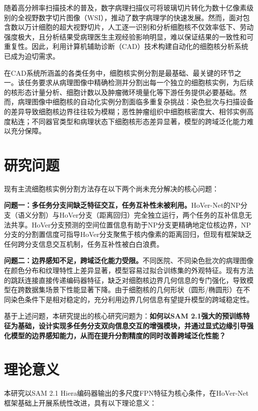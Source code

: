 \documentclass{sufethesismas}
\begin{document}
随着高分辨率扫描技术的普及，数字病理扫描仪可将玻璃切片转化为数十亿像素级别的全视野数字切片图像（WSI），推动了数字病理学的快速发展\cite{Niazi2019}。然而，面对包含数以万计细胞的超大视野切片，人工逐一识别和分析细胞核不仅效率低下、劳动强度极大，且分析结果受病理医生主观经验影响明显，难以保证结果的一致性和可重复性。因此，利用计算机辅助诊断（CAD）技术构建自动化的细胞核分析系统已成为迫切需求\cite{Xing2016}。

在CAD系统所涵盖的各类任务中，细胞核实例分割是最基础、最关键的环节之一。该任务要求从病理图像中精确检测并分割出每一个独立的细胞核实例，为后续的核形态计量分析、细胞计数以及肿瘤微环境量化等下游任务提供必要基础\cite{Hayakawa2021}。然而，病理图像中细胞核的自动化实例分割面临多重复杂挑战：染色批次与扫描设备的差异导致细胞核边界往往较为模糊；恶性肿瘤组织中细胞核密度大、相邻实例高度粘连；不同器官类型和病理状态下细胞核形态差异显著，模型的跨域泛化能力难以充分保障\cite{Jiao2022}。

\section{研究问题}

现有主流细胞核实例分割方法存在以下两个尚未充分解决的核心问题：

\textbf{问题一：多任务分支间缺乏特征交互，任务互补性未被利用。}HoVer-Net的NP分支（语义分割）与HoVer分支（距离回归）完全独立运行，两个任务的互补信息无法共享。HoVer分支预测的空间位置信息有助于NP分支更精确地定位核边界，NP分支的分割置信度可指导HoVer分支聚焦于核内像素的距离回归，但现有框架缺乏任何跨分支信息交互机制，任务互补性被白白浪费。

\textbf{问题二：边界感知不足，跨域泛化能力受限。}不同医院、不同染色批次的病理图像在颜色分布和纹理特性上差异显著，模型容易过拟合训练集的外观特征。现有方法的跳跃连接直接传递编码器特征，缺乏对细胞核边界几何信息的专门强化，导致模型在跨数据集场景下性能显著下降。由于细胞核的几何形状（圆形/椭圆形）在不同染色条件下是相对稳定的，充分利用边界几何信息有望提升模型的跨域稳定性。

基于上述问题，本研究提出的核心研究问题为：\textbf{如何以SAM 2.1强大的预训练特征为基础，设计实现多任务分支双向信息交互的增强模块，并通过显式边缘引导强化模型的边界感知能力，从而在提升分割精度的同时改善跨域泛化性能？}

\section{理论意义}

本研究以SAM 2.1 Hiera编码器输出的多尺度FPN特征为核心条件，在HoVer-Net框架基础上开展系统性改进，具有以下理论意义：
\end{document}
